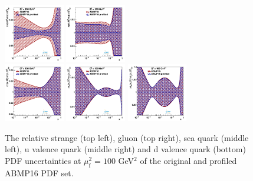 \documentclass[pdftex,twocolumn,epjc3]{svjour3}          %
\newcommand{\abmp} {ABMP16\xspace}
\begin{document}
\begin{figure}
    \centering
    {{\includegraphics[width=0.235\textwidth]{pics/pdf-profile-ffabm/q2_100_pdf_s_ratio.pdf}}}
    {{\includegraphics[width=0.235\textwidth]{pics/pdf-profile-ffabm/q2_100_pdf_g_ratio.pdf}}}\\
    {{\includegraphics[width=0.235\textwidth]{pics/pdf-profile-ffabm/q2_100_pdf_Sea_ratio.pdf}}}
    {{\includegraphics[width=0.235\textwidth]{pics/pdf-profile-ffabm/q2_100_pdf_uv_ratio.pdf}}}
    {{\includegraphics[width=0.235\textwidth]{pics/pdf-profile-ffabm/q2_100_pdf_dv_ratio.pdf}}}
    \caption{The relative strange (top left), gluon (top right), sea quark (middle left), u valence quark (middle right) and d valence quark (bottom) PDF uncertainties at $\mu_\mathrm{f}^2=100$ GeV$^2$ of the original and profiled \abmp PDF set.}
    \label{fig:pdf-abmp}
\end{figure}
\end{document}
